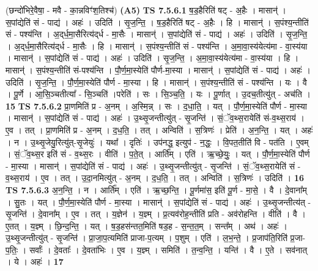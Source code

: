 \documentclass[17pt]{extarticle}
\begin{document}
                  \newline
                      (छन्दो॑भिरे॒वैषा॒ - मवै - का॒न्नविꣳ॑श॒तिश्च॑)  \textbf{(A5)} \newline \newline
                                \textbf{ TS 7.5.6.1} \newline
                  ष॒ड॒हैरिति॑ षट् - अ॒हैः । मासान्॑ । स॒पांद्येति॑ सं - पाद्य॑ । अहः॑ । उदिति॑ । सृ॒ज॒न्ति॒ । ष॒ड॒हैरिति॑ षट् - अ॒हैः । हि । मासान्॑ । स॒पंश्य॒न्तीति॑ सं - पश्य॑न्ति । अ॒द्‌र्ध॒मा॒सैरित्य॑द्‌र्ध - मा॒सैः । मासान्॑ । स॒पांद्येति॑ सं - पाद्य॑ । अहः॑ । उदिति॑ । सृ॒ज॒न्ति॒ । अ॒द्‌र्ध॒मा॒सैरित्य॑द्‌र्ध - मा॒सैः । हि । मासान्॑ । स॒पंश्य॒न्तीति॑ सं - पश्य॑न्ति । अ॒मा॒वा॒स्य॑येत्य॑मा - वा॒स्य॑या । मासान्॑ । स॒पांद्येति॑ सं - पाद्य॑ । अहः॑ । उदिति॑ । सृ॒ज॒न्ति॒ । अ॒मा॒वा॒स्य॑येत्य॑मा - वा॒स्य॑या । हि । मासान्॑ । स॒पंश्य॒न्तीति॑ सं-पश्य॑न्ति । पौ॒र्ण॒मा॒स्येति॑ पौर्ण-मा॒स्या । मासान्॑ । स॒पांद्येति॑ सं - पाद्य॑ । अहः॑ । उदिति॑ । सृ॒ज॒न्ति॒ । पौ॒र्ण॒मा॒स्येति॑ पौर्ण - मा॒स्या । हि । मासान्॑ । स॒पंश्य॒न्तीति॑ सं - पश्य॑न्ति । यः । वै । पू॒र्णे । आ॒सि॒ञ्चतीत्या᳚ - सि॒ञ्चति॑ ।परेति॑ । सः । सि॒ञ्च॒ति॒ । यः । पू॒र्णात् । उ॒दच॒तीत्यु॑त् - अच॑ति । \textbf{  15} \newline
                  \newline
                                \textbf{ TS 7.5.6.2} \newline
                  प्रा॒णमिति॑ प्र - अ॒नम् । अ॒स्मि॒न्न् । सः । द॒धा॒ति॒ । यत् । पौ॒र्ण॒मा॒स्येति॑ पौर्ण - मा॒स्या । मासान्॑ । स॒पांद्येति॑ सं - पाद्य॑ । अहः॑ । उ॒थ्सृ॒जन्तीत्यु॑त् - सृ॒जन्ति॑ । सं॒ॅव॒थ्स॒रायेति॑ सं-व॒थ्स॒राय॑ । ए॒व । तत् । प्रा॒णमिति॑ प्र - अ॒नम् । द॒ध॒ति॒ । तत् । अन्विति॑ । स॒त्रिणः॑ । प्रेति॑ । अ॒न॒न्ति॒ । यत् । अहः॑ । न । उ॒थ्सृ॒जेयु॒रित्यु॑त्-सृ॒जेयुः॑ । यथा᳚ । दृतिः॑ । उप॑नद्ध॒ इत्युप॑ - न॒द्धः॒ । वि॒पत॒तीति॑ वि - पत॑ति । ए॒वम् । सं॒ॅव॒थ्स॒र इति॑ सं - व॒थ्स॒रः । वीति॑ । प॒ते॒त् । आर्ति᳚म् । एति॑ । ऋ॒च्छे॒युः॒ । यत् । पौ॒र्ण॒मा॒स्येति॑ पौर्ण - मा॒स्या । मासान्॑ । स॒पांद्येति॑ सं - पाद्य॑ । अहः॑ । उ॒थ्सृ॒जन्तीत्यु॑त् - सृ॒जन्ति॑ । सं॒ॅव॒थ्स॒रायेति॑ सं - व॒थ्स॒राय॑ । ए॒व । तत् । उ॒दा॒नमित्यु॑त् - अ॒नम् । द॒ध॒ति॒ । तत् । अन्विति॑ । स॒त्रिणः॑ । उदिति॑ । \textbf{  16} \newline
                  \newline
                                \textbf{ TS 7.5.6.3} \newline
                  अ॒न॒न्ति॒ । न । आर्ति᳚म् । एति॑ । ऋ॒च्छ॒न्ति॒ । पू॒र्णमा॑स॒ इति॑ पू॒र्ण - मा॒से॒ । वै । दे॒वाना᳚म् । सु॒तः । यत् । पौ॒र्ण॒मा॒स्येति॑ पौर्ण - मा॒स्या । मासान्॑ । स॒पांद्येति॑ सं - पाद्य॑ । अहः॑ । उ॒थ्सृ॒जन्तीत्य॑त् - सृ॒जन्ति॑ । दे॒वाना᳚म् । ए॒व । तत् । य॒ज्ञेन॑ । य॒ज्ञ्म् । प्र॒त्यव॑रोह॒न्तीति॑ प्रति - अव॑रोहन्ति । वीति॑ । वै । ए॒तत् । य॒ज्ञ्म् । छि॒न्द॒न्ति॒ । यत् । ष॒ड॒हस॑न्तत॒मिति॑ षड॒ह - स॒न्त॒त॒म् । सन्त᳚म् । अथ॑ । अहः॑ । उ॒थ्सृ॒जन्तीत्यु॑त् - सृ॒जन्ति॑ । प्रा॒जा॒प॒त्यमिति॑ प्राजा-प॒त्यम् । प॒शुम् । एति॑ । ल॒भ॒न्ते॒ । प्र॒जाप॑ति॒रिति॑ प्र॒जा-प॒तिः॒ । सर्वाः᳚ । दे॒वताः᳚ । दे॒वता॑भिः । ए॒व । य॒ज्ञ्म् । समिति॑ । त॒न्व॒न्ति॒ । यन्ति॑ । वै । ए॒ते । सव॑नात् । ये । अहः॑ । \textbf{  17} \newline
\end{document}
